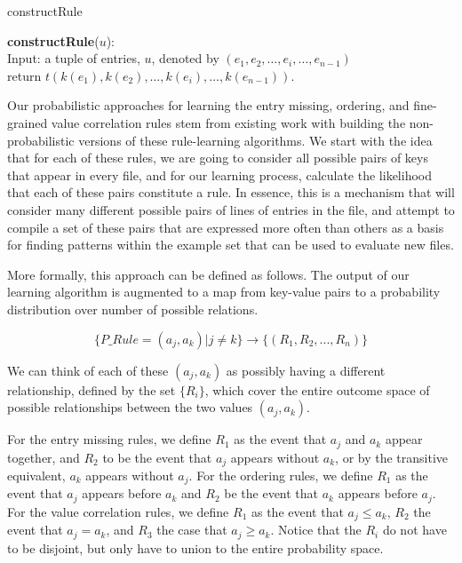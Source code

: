 \begin{algorithm}
\caption{constructRule}
  \begin{algorithmic}[1]
  \State \textbf{constructRule}($u$):\\
  Input: a tuple of entries, $u$, denoted by $(e_1, e_2, \ldots, e_i, \ldots, e_{n-1})$ \\
    \State return $t(k(e_1), k(e_2), \ldots, k(e_i), \ldots, k(e_{n-1}))$.
  \end{algorithmic}
\end{algorithm}


Our probabilistic approaches for learning the entry missing, 
ordering, and fine-grained value correlation rules stem 
from existing work with building 
the non-probabilistic versions of these rule-learning algorithms. 
We start with the idea that for each of these rules, 
we are going to consider all possible pairs of keys that appear in every 
file, and for our learning process, calculate the likelihood that each of 
these pairs constitute a rule. 
In essence, this is a mechanism that will consider many different possible 
pairs of lines of entries in the file, 
and attempt to compile a set of these pairs 
that are expressed more often than others as a basis for finding patterns 
within the example set that can be used to evaluate new files.

More formally, this approach can be defined as follows. 
The output of our learning algorithm is augmented to a map from 
key-value pairs to a probability distribution over number of possible 
relations.

\[
\{ P\_Rule = (a_j, a_k) | j \neq k \} \rightarrow \{ (R_1, R_2, ... , R_n) \}
\]

We can think of each of these $(a_j, a_k)$ as possibly having a different relationship, defined by the set $\{ R_i \}$, which cover the entire outcome space of possible relationships between the two values $(a_j, a_k)$.

For the entry missing rules, we define $R_1$ as the event that $a_j$ and
$a_k$ appear together, and $R_2$ to be the event that $a_j$ appears
without $a_k$, or by the transitive equivalent, $a_k$ appears without
$a_j$. For the ordering rules, we define $R_1$ as the event that
$a_j$ appears before $a_k$ and $R_2$ be the event that $a_k$ appears
before $a_j$. For the value correlation rules, we define $R_1$ as the
event that $a_j \leq a_k$, $R_2$ the event that $a_j = a_k$, and $R_3$
the case that $a_j \geq a_k$. Notice that the $R_i$ do not have to be
disjoint, but only have to union to the entire probability space.

